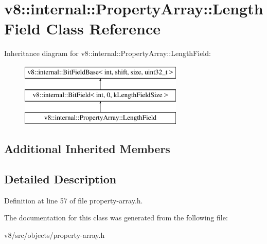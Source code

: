\hypertarget{classv8_1_1internal_1_1PropertyArray_1_1LengthField}{}\section{v8\+:\+:internal\+:\+:Property\+Array\+:\+:Length\+Field Class Reference}
\label{classv8_1_1internal_1_1PropertyArray_1_1LengthField}
Inheritance diagram for v8\+:\+:internal\+:\+:Property\+Array\+:\+:Length\+Field\+:\begin{figure}[H]
\begin{center}
\leavevmode
\includegraphics[height=3.000000cm]{classv8_1_1internal_1_1PropertyArray_1_1LengthField}
\end{center}
\end{figure}
\subsection*{Additional Inherited Members}


\subsection{Detailed Description}


Definition at line 57 of file property-\/array.\+h.



The documentation for this class was generated from the following file\+:\begin{DoxyCompactItemize}
\item 
v8/src/objects/property-\/array.\+h\end{DoxyCompactItemize}
